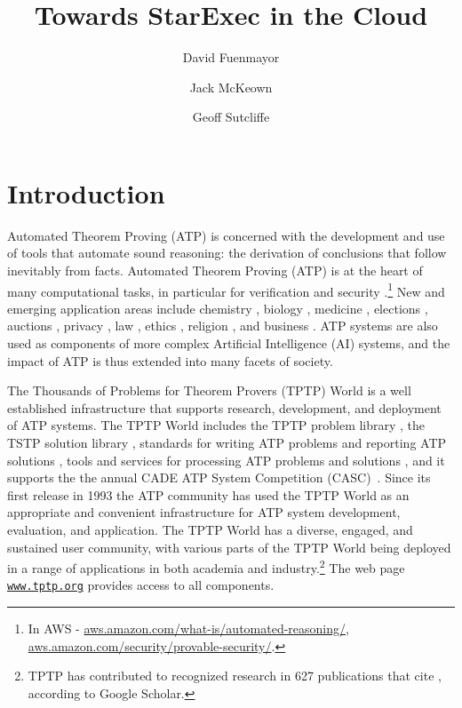 \documentclass{easychair}
\title{Towards StarExec in the Cloud}
\author{
  David Fuenmayor\inst{1}
\and
  Jack McKeown\inst{2}
\and
  Geoff Sutcliffe\inst{2}
}
\institute{
  University of Bamberg,
  Bamberg, Germany\\
  \email{david.fuenmayor@uni-bamberg.de}
\and
  University of Miami,
  Miami, USA\\
  \email{jam771@miami.edu,geoff@cs.miami.edu}
}
\begin{document}
\maketitle

\begin{abstract}
\end{abstract}
\section{Introduction}
\label{Introduction}

Automated Theorem Proving (ATP) is concerned with the development and use of tools that automate 
sound reasoning: the derivation of conclusions that follow inevitably from facts.
Automated Theorem Proving (ATP) is at the heart of many computational tasks, in particular for
verification \cite{Har06,HH19} and security \cite{Coo18}.\footnote{%
In AWS -
\href{https://aws.amazon.com/what-is/automated-reasoning/}{aws.amazon.com/what-is/automated-reasoning/}, 
\href{https://aws.amazon.com/security/provable-security//}{aws.amazon.com/security/provable-security/}.} 
New and emerging application areas include
chemistry \cite{Yad17}, 
biology \cite{CC+13}, 
medicine \cite{HLB05},
elections \cite{Nip09,BDS17}, 
auctions \cite{CK+15}, 
privacy \cite{Lib20},
law \cite{PS15}, 
ethics \cite{DF+16}, 
religion \cite{OZ11,BW14-ECAI,Hor19},
and business \cite{Han98}.
ATP systems are also used as components of more complex Artificial Intelligence (AI) systems,
and the impact of ATP is thus extended into many facets of society.

The Thousands of Problems for Theorem Provers (TPTP) World \cite{Sut24} is a well established 
infrastructure that supports research, development, and deployment of ATP systems.
The TPTP World includes 
the TPTP problem library \cite{Sut17},
the TSTP solution library \cite{Sut10},
standards for writing ATP problems and reporting ATP solutions \cite{SS+06,Sut08-KEAPPA},
tools and services for processing ATP problems and solutions \cite{Sut10},
and it supports the the annual CADE ATP System Competition (CASC)~\cite{Sut16}.
Since its first release in 1993 the ATP community has used the TPTP World as an appropriate and 
convenient infrastructure for ATP system development, evaluation, and application.
The TPTP World has a diverse, engaged, and sustained user community, with various parts of the 
TPTP World being deployed in a range of applications in both academia and industry.\footnote{%
TPTP has contributed to recognized research in 627 publications that cite \cite{Sut17},
according to Google Scholar.}
The web page \href{https://www.tptp.org}{\tt www.tptp.org} provides access to all components.
\end{document}
